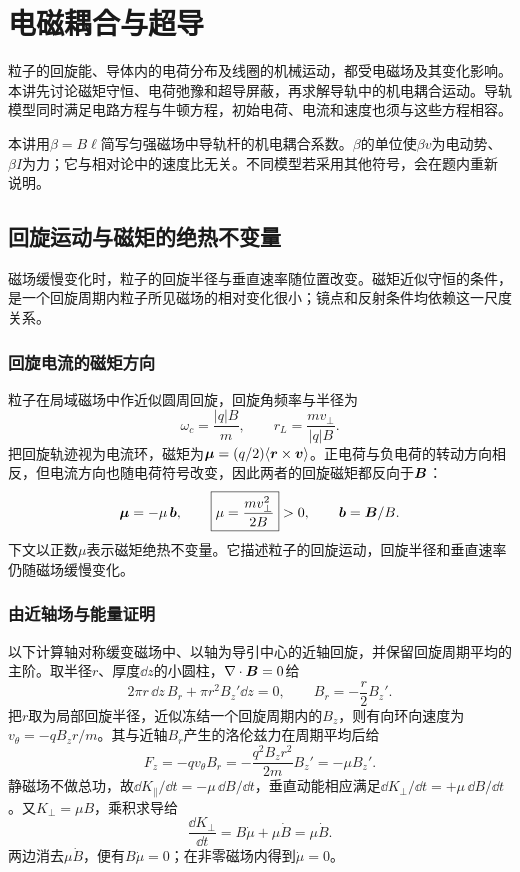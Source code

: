 \chapter{电磁耦合与超导}
粒子的回旋能、导体内的电荷分布及线圈的机械运动，都受电磁场及其变化影响。本讲先讨论磁矩守恒、电荷弛豫和超导屏蔽，再求解导轨中的机电耦合运动。导轨模型同时满足电路方程与牛顿方程，初始电荷、电流和速度也须与这些方程相容。

本讲用$\beta=B\ell$简写匀强磁场中导轨杆的机电耦合系数。$\beta$的单位使$\beta v$为电动势、$\beta I$为力；它与相对论中的速度比无关。不同模型若采用其他符号，会在题内重新说明。



\section{回旋运动与磁矩的绝热不变量}\label{sec:i3-adiabatic}
磁场缓慢变化时，粒子的回旋半径与垂直速率随位置改变。磁矩近似守恒的条件，是一个回旋周期内粒子所见磁场的相对变化很小；镜点和反射条件均依赖这一尺度关系。

\subsection{回旋电流的磁矩方向}
粒子在局域磁场中作近似圆周回旋，回旋角频率与半径为
\[\omega_c=\frac{|q|B}{m},\qquad r_L=\frac{mv_\perp}{|q|B}.
\]
把回旋轨迹视为电流环，磁矩为$\bm{\mu}=(q/2)\langle\bm{r}\times\bm{v}\rangle$。正电荷与负电荷的转动方向相反，但电流方向也随电荷符号改变，因此两者的回旋磁矩都反向于$\bm{B}$：
\[\bm{\mu}=-\mu\,\bm{b},\qquad
\boxed{\mu=\frac{mv_\perp^2}{2B}}>0,\qquad \bm{b}=\bm{B}/B.
\]
下文以正数$\mu$表示磁矩绝热不变量。它描述粒子的回旋运动，回旋半径和垂直速率仍随磁场缓慢变化。

\subsection{由近轴场与能量证明}
以下计算轴对称缓变磁场中、以轴为导引中心的近轴回旋，并保留回旋周期平均的主阶。取半径$r$、厚度$\dd z$的小圆柱，$\nabla\cdot\bm{B}=0$给
\[2\pi r\,\dd z\,B_r+\pi r^2B_z'\dd z=0,\qquad
B_r=-\frac r2B_z'.
\]
把$r$取为局部回旋半径，近似冻结一个回旋周期内的$B_z$，则有向环向速度为$v_\theta=-qB_zr/m$。其与近轴$B_r$产生的洛伦兹力在周期平均后给
\[F_z=-qv_\theta B_r
=-\frac{q^2B_zr^2}{2m}B_z'=-\mu B_z'.
\]
静磁场不做总功，故$\dd K_\parallel/\dd t=-\mu\,\dd B/\dd t$，垂直动能相应满足$\dd K_\perp/\dd t=+\mu\,\dd B/\dd t$。又$K_\perp=\mu B$，乘积求导给
\[\frac{\dd K_\perp}{\dd t}=B\dot\mu+\mu\dot B=\mu\dot B.\]
两边消去$\mu\dot B$，便有$B\dot\mu=0$；在非零磁场内得到$\dot\mu=0$。

